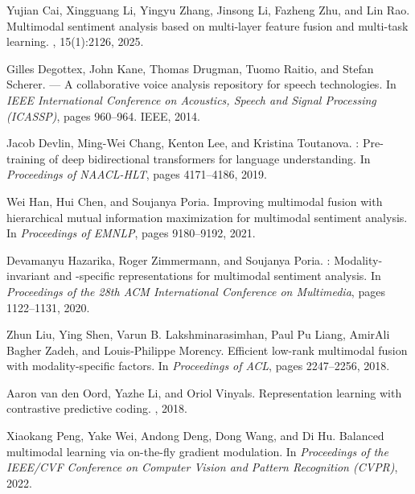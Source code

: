 \documentclass[11pt,twocolumn]{article}
\begin{document}
\begin{thebibliography}{}

Yujian Cai, Xingguang Li, Yingyu Zhang, Jinsong Li, Fazheng Zhu, and Lin Rao.
\newblock Multimodal sentiment analysis based on multi-layer feature fusion and
  multi-task learning.
, 15(1):2126, 2025.

Gilles Degottex, John Kane, Thomas Drugman, Tuomo Raitio, and Stefan Scherer.
 --- {A} collaborative voice analysis repository for speech
  technologies.
\newblock In {\em IEEE International Conference on Acoustics, Speech and Signal
  Processing (ICASSP)}, pages 960--964. IEEE, 2014.

Jacob Devlin, Ming-Wei Chang, Kenton Lee, and Kristina Toutanova.
: Pre-training of deep bidirectional transformers for language
  understanding.
\newblock In {\em Proceedings of NAACL-HLT}, pages 4171--4186, 2019.

Wei Han, Hui Chen, and Soujanya Poria.
\newblock Improving multimodal fusion with hierarchical mutual information
  maximization for multimodal sentiment analysis.
\newblock In {\em Proceedings of EMNLP}, pages 9180--9192, 2021.

Devamanyu Hazarika, Roger Zimmermann, and Soujanya Poria.
: Modality-invariant and -specific representations for
  multimodal sentiment analysis.
\newblock In {\em Proceedings of the 28th ACM International Conference on
  Multimedia}, pages 1122--1131, 2020.

Zhun Liu, Ying Shen, Varun B. Lakshminarasimhan, Paul Pu Liang,
  AmirAli Bagher Zadeh, and Louis-Philippe Morency.
\newblock Efficient low-rank multimodal fusion with modality-specific factors.
\newblock In {\em Proceedings of ACL}, pages 2247--2256, 2018.

Aaron van den Oord, Yazhe Li, and Oriol Vinyals.
\newblock Representation learning with contrastive predictive coding.
, 2018.

Xiaokang Peng, Yake Wei, Andong Deng, Dong Wang, and Di Hu.
\newblock Balanced multimodal learning via on-the-fly gradient modulation.
\newblock In {\em Proceedings of the IEEE/CVF Conference on Computer Vision and
  Pattern Recognition (CVPR)}, 2022.


\end{thebibliography}
\end{document}
